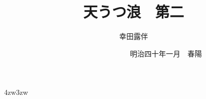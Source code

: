 \documentclass[dvipdfmx,uplatex,tate,book,paper=a5paper,jafontsize=13pt,
    open_bracket_pos=nibu_tentsuki,hanging_punctuation]{jlreq}
\title{\Huge 天うつ浪　{\Large 第二}}
\author{幸田露伴}
\date{　　　　　　　　　{\small 明治四十年一月}　春陽{\換字{堂}}}
\newcommand{\詰めruby}[2]{\ruby[g]{#1}{{\kanjiskip=0pt plus 0pt minus 0pt #2}}}
\newcommand{\原本頁}[1]{}
\begin{document}
\maketitle
\pagestyle{myheadings}
\newcommand{\Entry}[1]{
	\section*{#1}
	\markboth{#1}{#1}
	\setcounter{equation}{0}}
\begin{indentation}{4zw}{3zw}
\parindent=0pt
\newpage
\　%
\newpage



















































\end{indentation}
\end{document}
